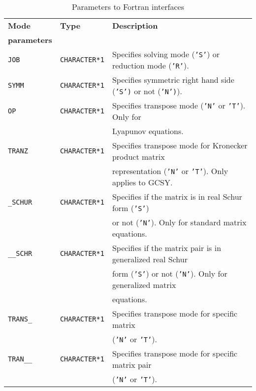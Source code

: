 \documentclass[11pt]{article}
\begin{document}
\begin{table}[!htb]
\scriptsize \centering \caption{Parameters to Fortran interfaces}
\begin{tabular}{|l|l|l|} \hline

{\bf Mode} & {\bf Type} & {\bf Description} \\
{\bf parameters} &  &  \\
\hline

\texttt{JOB} & \texttt{CHARACTER*1} & Specifies solving mode
(\texttt{'S'}) or reduction mode (\texttt{'R'}). \\

\texttt{SYMM} & \texttt{CHARACTER*1} & Specifies symmetric right
hand side (\texttt{'S')} or not (\texttt{'N')}).
\\

\texttt{OP} & \texttt{CHARACTER*1} & Specifies transpose mode
(\texttt{'N'} or \texttt{'T'}). Only for  \\
            & & Lyapunov equations. \\

\texttt{TRANZ} & \texttt{CHARACTER*1} & Specifies transpose mode for Kronecker product matrix  \\
               &                      & representation (\texttt{'N'} or \texttt{'T'}). Only applies to GCSY. \\

\texttt{\_SCHUR} & \texttt{CHARACTER*1} & Specifies if the matrix is in real Schur form (\texttt{'S'})  \\
                 &                      & or not (\texttt{'N'}). Only for standard matrix equations. \\

\texttt{\_\_SCHR} & \texttt{CHARACTER*1} & Specifies if the matrix pair is in generalized real Schur  \\
                  &                      & form (\texttt{'S'}) or not (\texttt{'N'}). Only for generalized matrix \\
                  &                      &  equations. \\

\texttt{TRANS\_} & \texttt{CHARACTER*1} & Specifies transpose mode
for specific matrix  \\

 &  & (\texttt{'N'} or \texttt{'T'}). \\

\texttt{TRAN\_\_} & \texttt{CHARACTER*1} & Specifies transpose
mode for specific matrix pair \\
 & & (\texttt{'N'} or \texttt{'T'}). \\



\end{tabular}
\end{table}
\end{document}
